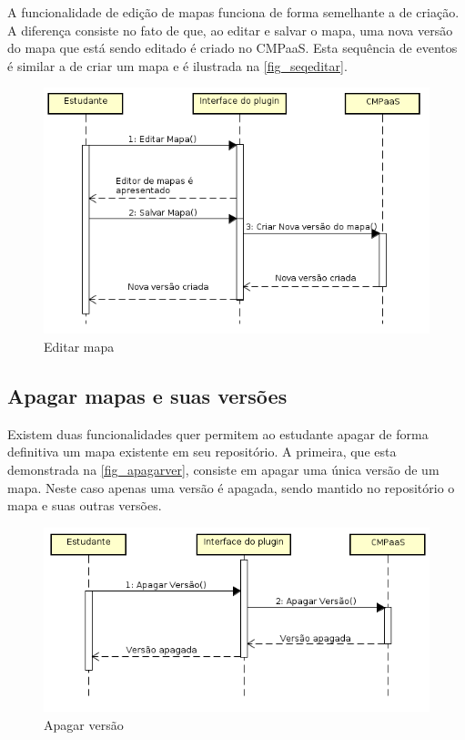 \documentclass[
	12pt,				%
	openright,			%
	oneside,			%
	a4paper,			%
	english,			%
	french,				%
	spanish,			%
	brazil				%
	]{abntex2}
\begin{document}
A funcionalidade de edição de mapas funciona de forma semelhante a de criação. A diferença consiste no fato de que, ao editar e salvar o mapa, uma nova versão do mapa que está sendo editado é criado no CMPaaS. Esta sequência de eventos é similar a de criar um mapa e é ilustrada na \autoref{fig_seqeditar}. 

\begin{figure}[htb]
	\caption{\label{fig_seqeditar} Editar mapa}
	\begin{center}
		\includegraphics[scale=0.5]{seqeditar.png}
	\end{center}
\end{figure}

\subsection{Apagar mapas e suas versões}

Existem duas funcionalidades quer permitem ao estudante apagar de forma definitiva um mapa existente em seu repositório. A primeira, que esta demonstrada na \autoref{fig_apagarver}, consiste em apagar uma única versão de um mapa. Neste caso apenas uma versão é apagada, sendo mantido no repositório o mapa e suas outras versões.
 

\begin{figure}[htb]
	\caption{\label{fig_apagarver} Apagar versão}
	\begin{center}
		\includegraphics[scale=0.5]{apagarver.png}
	\end{center}
\end{figure}
\end{document}
